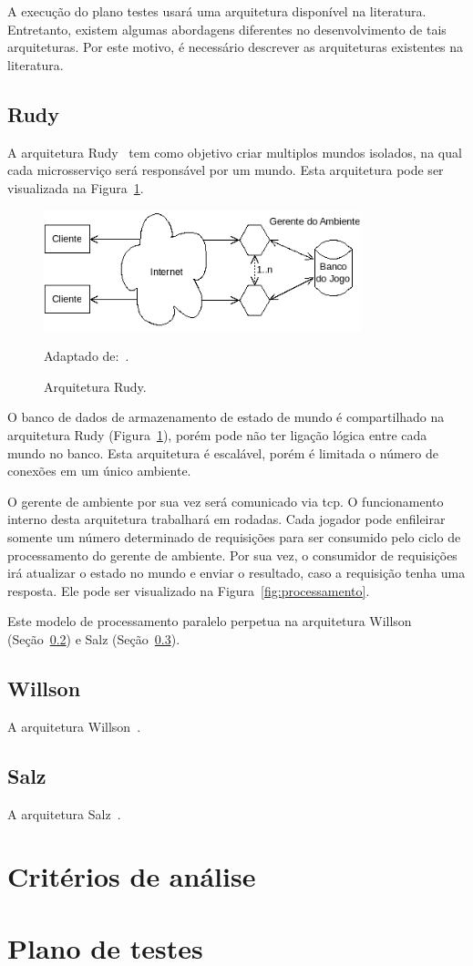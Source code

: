 A execução do plano testes usará uma arquitetura disponível na literatura.
%
Entretanto, existem algumas abordagens diferentes no desenvolvimento de tais arquiteturas.
%
Por este motivo, é necessário descrever as arquiteturas existentes na literatura.



\subsection{Rudy}

A arquitetura Rudy~\cite{matthiasrudy2011} tem como objetivo criar multiplos mundos isolados, na qual cada microsserviço será responsável por um mundo.
%
Esta arquitetura pode ser visualizada na Figura~\ref{rudy}.


\begin{figure}[htb!]
  \caption{Arquitetura Rudy.}
  \label{rudy}
  \includegraphics[height=3.5cm]{img/cap3/rudy.png}
  \centering

  Adaptado de:~\cite{matthiasrudy2011}.
\end{figure}

O banco de dados de armazenamento de estado de mundo é compartilhado na arquitetura Rudy (Figura~\ref{rudy}), porém pode não ter ligação lógica entre cada mundo no banco.
%
Esta arquitetura é escalável, porém é limitada o número de conexões em um único ambiente.



O gerente de ambiente por sua vez será comunicado via \ac{tcp}.
%
O funcionamento interno desta arquitetura trabalhará em rodadas.
%
Cada jogador pode enfileirar somente um número determinado de requisições para ser consumido pelo ciclo de processamento do gerente de ambiente.
%
Por sua vez, o consumidor de requisições irá atualizar o estado no mundo e enviar o resultado, caso a requisição tenha uma resposta.
%
Ele pode ser visualizado na Figura~\ref{fig:processamento}.

Este modelo de processamento paralelo perpetua na arquitetura Willson (Seção~\ref{willson}) e Salz (Seção~\ref{salz}).


\subsection{Willson}
\label{willson}

A arquitetura Willson~\cite{stephenclarkewillson2017}.

\subsection{Salz}
\label{salz}

A arquitetura Salz~\cite{albion_online_unite}.

\section{Critérios de análise}
\label{analise}

\section{Plano de testes}
\label{testes}
